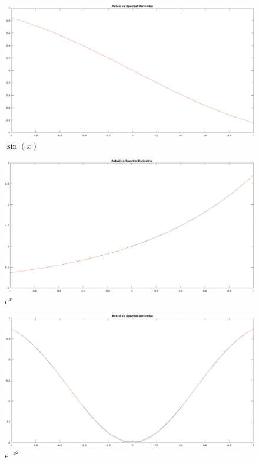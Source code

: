 \begin{solution}
    \begin{figure}[htp]
        \centering
        \includegraphics[scale=0.10]{8_5sin.PNG}
        \caption{$\sin(x)$}
    \end{figure}
    \begin{figure}[htp]
        \centering
        \includegraphics[scale=0.10]{8_5exp.PNG}
        \caption{$e^x$}
    \end{figure}
    \begin{figure}[htp]
        \centering
        \includegraphics[scale=0.10]{8_5expx2.PNG}
        \caption{$e^{-x^2}$}
    \end{figure}

\end{solution}

\newpage
